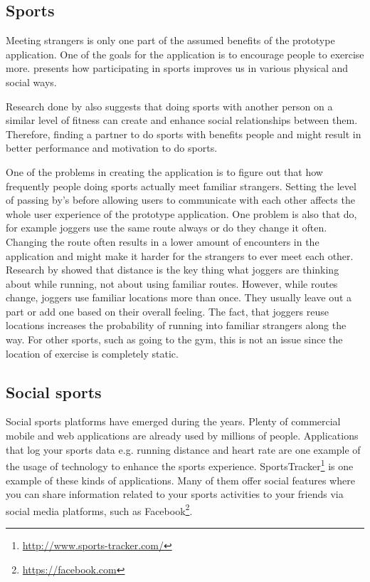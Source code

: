 \subsection{Sports}

Meeting strangers is only one part of the assumed benefits of the prototype application. One of the goals for the application is to encourage people to exercise more. \citep{foundations} presents how participating in sports improves us in various physical and social ways. 

Research done by \citep{joggingTheDistance} also suggests that doing sports with another person on a similar level of fitness can create and enhance social relationships between them. Therefore, finding a partner to do sports with benefits people and might result in better performance and motivation to do sports.

One of the problems in creating the application is to figure out that how frequently people doing sports actually meet familiar strangers. Setting the level of passing by's before allowing users to communicate with each other affects the whole user experience of the prototype application. One problem is also that do, for example joggers use the same route always or do they change it often. Changing the route often results in a lower amount of encounters in the application and might make it harder for the strangers to ever meet each other. Research by \cite{runningNavigation} showed that distance is the key thing what joggers are thinking about while running, not about using familiar routes. However, while routes change, joggers use familiar locations more than once. They usually leave out a part or add one based on their overall feeling. The fact, that joggers reuse locations increases the probability of running into familiar strangers along the way. For other sports, such as going to the gym, this is not an issue since the location of exercise is completely static.

\subsection{Social sports}

Social sports platforms have emerged during the years. Plenty of commercial mobile and web applications  are already used by millions of people. Applications that log your sports data e.g. running distance and heart rate are one example of the usage of technology to enhance the sports experience. SportsTracker\footnote{\url{http://www.sports-tracker.com/}} is one example of these kinds of applications. Many of them offer social features where you can share information related to your sports activities to your friends via social media platforms, such as Facebook\footnote{\url{https://facebook.com}}.


